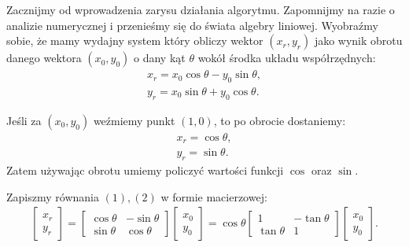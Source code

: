 \documentclass{mwart}
\theoremstyle{remark}
\theoremstyle{definition}
\theoremstyle{definition}
\begin{document}
Zacznijmy od wprowadzenia zarysu działania algorytmu. Zapomnijmy na razie o analizie numerycznej i przenieśmy się do świata algebry liniowej. Wyobraźmy sobie, że mamy wydajny system który obliczy wektor $(x_r, y_r)$ jako wynik obrotu danego wektora $(x_0, y_0)$ o dany kąt $\theta$ wokół środka układu współrzędnych:
\begin{align}
  x_r = x_0\cos\theta - y_0\sin\theta, \\
  y_r = x_0\sin\theta + y_0\cos\theta.
\end{align}

Jeśli za $(x_0, y_0)$ weźmiemy punkt $(1, 0)$, to po obrocie dostaniemy:
\begin{align*}
  x_r = \cos\theta, \\
  y_r = \sin\theta.
\end{align*}
Zatem używając obrotu umiemy policzyć wartości funkcji $\cos$ oraz $\sin$.

Zapiszmy równania $(1), (2)$ w formie macierzowej:
\begin{align}
  \begin{bmatrix}
    x_r \\ y_r
  \end{bmatrix}
  = \begin{bmatrix}
    \cos\theta & -\sin\theta \\
    \sin\theta & \cos\theta
  \end{bmatrix}
  \begin{bmatrix}
    x_0 \\ y_0
  \end{bmatrix}
  = \cos\theta
  \begin{bmatrix}
    1          & -\tan\theta \\
    \tan\theta & 1
  \end{bmatrix}
  \begin{bmatrix}
    x_0 \\ y_0
  \end{bmatrix}.
\end{align}
\end{document}
